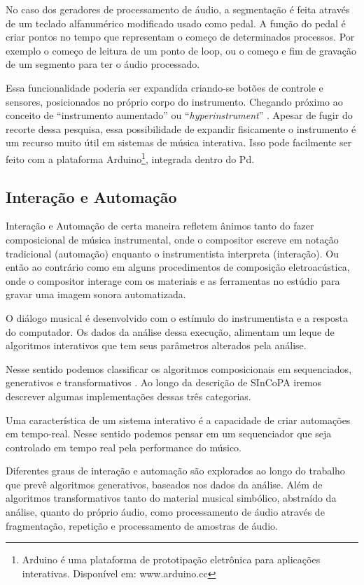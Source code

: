 \documentclass{ppgmus}
\begin{document}
No caso dos geradores de processamento de áudio, a segmentação é feita 
através de um teclado alfanumérico modificado usado como pedal. A função
do pedal é criar pontos no tempo que representam o começo de determinados
processos. Por exemplo o começo de leitura de um ponto de loop, ou o começo
e fim de gravação de um segmento para ter o áudio processado.

Essa funcionalidade poderia ser expandida criando-se botões de controle
e sensores, posicionados no próprio corpo do instrumento. Chegando próximo ao conceito
de ``instrumento aumentado'' ou ``\textit{hyperinstrument}'' \cite{hyperinstrumento}. 
Apesar de fugir do recorte dessa pesquisa, essa possibilidade
de expandir fisicamente o instrumento é um recurso muito útil em sistemas de
música interativa. Isso pode facilmente ser feito com a plataforma Arduino\footnote{Arduino
é uma plataforma de prototipação eletrônica para aplicações interativas. Disponível em: 
www.arduino.cc}, integrada dentro do Pd. 




\subsection{Interação e Automação}

Interação e Automação de certa maneira refletem ânimos tanto do
fazer composicional de música instrumental, onde o compositor
escreve em notação tradicional (automação) enquanto o instrumentista
interpreta (interação). Ou então ao contrário como em alguns procedimentos
de composição eletroacústica, onde o compositor interage com os materiais
e as ferramentas no estúdio para gravar uma imagem sonora automatizada.

O diálogo musical é desenvolvido com o estímulo
do instrumentista e a resposta do computador. Os dados
da análise dessa execução, alimentam um leque de algoritmos
interativos que tem seus parâmetros alterados pela análise.

Nesse sentido podemos classificar os algoritmos composicionais
em sequenciados, generativos e transformativos \cite{rowe93:interactive}.
Ao longo da descrição de SInCoPA iremos descrever algumas implementações
dessas três categorias.

Uma característica de um sistema interativo é a capacidade de criar
automações em tempo-real. Nesse sentido podemos pensar em um sequenciador
que seja controlado em tempo real pela performance do músico.

Diferentes graus de interação e automação são explorados ao longo do
trabalho que prevê algoritmos generativos, baseados nos dados da análise. 
Além de algoritmos transformativos tanto do material musical simbólico,
abstraído da análise, quanto do próprio áudio, como processamento de áudio
através de fragmentação, repetição e processamento de amostras de áudio.
\end{document}

